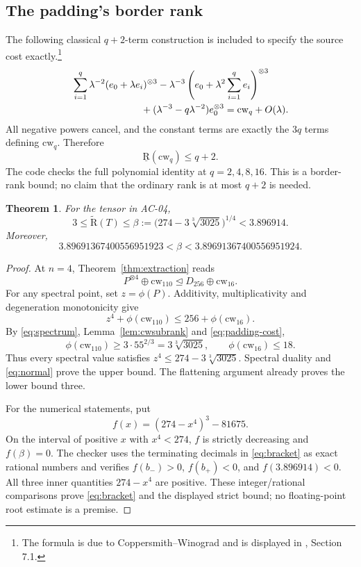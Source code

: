 \documentclass[11pt]{article}
\newtheorem{theorem}{Theorem}[section]
\theoremstyle{definition}\newtheorem{definition}[theorem]{Definition}
\newcommand{\BR}{\underline{\mathrm R}}
\newcommand{\AR}{\widetilde{\mathrm R}}
\newcommand{\cw}{\mathrm{cw}}
\newcommand{\degen}{\trianglelefteq}
\begin{document}
\subsection{The padding's border rank}
The following classical $q+2$-term construction is included to specify the source cost exactly.\footnote{The formula is due to Coppersmith--Winograd and is displayed in \cite{almanli}, Section 7.1.}
\begin{align}\label{eq:border}
&\sum_{i=1}^q\lambda^{-2}(e_0+\lambda e_i)^{\otimes3}
-\lambda^{-3}\left(e_0+\lambda^2\sum_{i=1}^q e_i\right)^{\otimes3}\notag\\
&\hspace{25mm}+(\lambda^{-3}-q\lambda^{-2})e_0^{\otimes3}
=\cw_q+O(\lambda).
\end{align}
All negative powers cancel, and the constant terms are exactly the $3q$ terms defining $\cw_q$. Therefore
\begin{equation}\label{eq:padding-cost}
\BR(\cw_q)\le q+2.
\end{equation}
The code checks the full polynomial identity at $q=2,4,8,16$. This is a border-rank bound; no claim that the ordinary rank is at most $q+2$ is needed.

\begin{theorem}\label{thm:upper}
For the tensor in AC-04,
\begin{equation}\label{eq:newbound}
3\le\AR(T)\le\beta
:=\bigl(274-3\sqrt[3]{3025}\bigr)^{1/4}<3.896914.
\end{equation}
Moreover,
\begin{equation}\label{eq:bracket}
3.89691367400556951923<\beta<3.89691367400556951924.
\end{equation}
\end{theorem}
\begin{proof}
At $n=4$, Theorem~\ref{thm:extraction} reads
\begin{equation}\label{eq:n4}
P^{\otimes4}\oplus\cw_{110}\degen D_{256}\oplus\cw_{16}.
\end{equation}
For any spectral point, set $z=\phi(P)$. Additivity, multiplicativity and degeneration monotonicity give
\[
z^4+\phi(\cw_{110})\le256+\phi(\cw_{16}).
\]
By \eqref{eq:spectrum}, Lemma~\ref{lem:cwsubrank} and \eqref{eq:padding-cost},
\[
\phi(\cw_{110})\ge3\cdot55^{2/3}=3\sqrt[3]{3025},
\qquad \phi(\cw_{16})\le18.
\]
Thus every spectral value satisfies $z^4\le274-3\sqrt[3]{3025}$. Spectral duality and \eqref{eq:normal} prove the upper bound. The flattening argument already proves the lower bound three.

For the numerical statements, put
\[
f(x)=(274-x^4)^3-81675.
\]
On the interval of positive $x$ with $x^4<274$, $f$ is strictly decreasing and $f(\beta)=0$. The checker uses the terminating decimals in \eqref{eq:bracket} as exact rational numbers and verifies $f(b_-)>0$, $f(b_+)<0$, and $f(3.896914)<0$. All three inner quantities $274-x^4$ are positive. These integer/rational comparisons prove \eqref{eq:bracket} and the displayed strict bound; no floating-point root estimate is a premise.
\end{proof}
\end{document}
